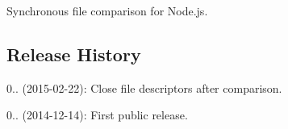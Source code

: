 \href{https://travis-ci.org/mgeisler/file-sync-cmp}{\tt }

Synchronous file comparison for Node.\+js.

\subsection*{Release History }


\begin{DoxyItemize}
\item 0.. (2015-\/02-\/22)\+: Close file descriptors after comparison.
\item 0.. (2014-\/12-\/14)\+: First public release. 
\end{DoxyItemize}